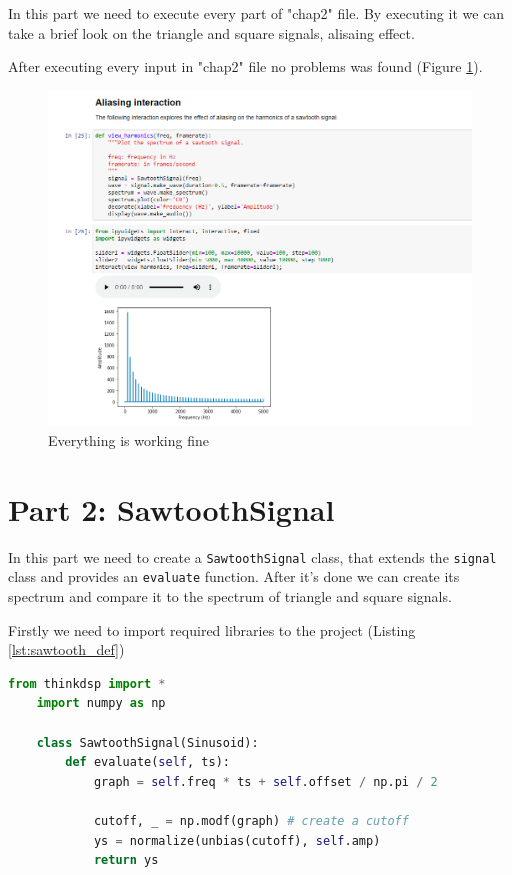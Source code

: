 \documentclass[a4paper]{article}
\begin{document}
        In this part we need to execute every part of "chap2" file. By executing it we can take a brief look on the triangle and square signals, alisaing effect.  
        
        After executing every input in "chap2" file no problems was found (Figure \ref{fig:work_check}).
        
        \begin{figure}[h]
            \centering
            \includegraphics[width=\textwidth]{img/work_check.png}
            \caption{Everything is working fine}
            \label{fig:work_check}
        \end{figure}
    
    \newpage
        \section{Part 2: SawtoothSignal}

        In this part we need to create a \texttt{SawtoothSignal} class, that extends the \texttt{signal} class and provides an \texttt{evaluate} function. After it's done we can create its spectrum and compare it to the spectrum of triangle and square signals.
        
        Firstly we need to import required libraries to the project (Listing \ref{lst:sawtooth_def})
            
        \begin{lstlisting}[language=Python,caption={Sawrooth class definition},label={lst:sawtooth_def}]
    from thinkdsp import *
    import numpy as np
    
    class SawtoothSignal(Sinusoid):
        def evaluate(self, ts):
            graph = self.freq * ts + self.offset / np.pi / 2
            
            cutoff, _ = np.modf(graph) # create a cutoff
            ys = normalize(unbias(cutoff), self.amp)
            return ys
        \end{lstlisting}
        
\end{document}
